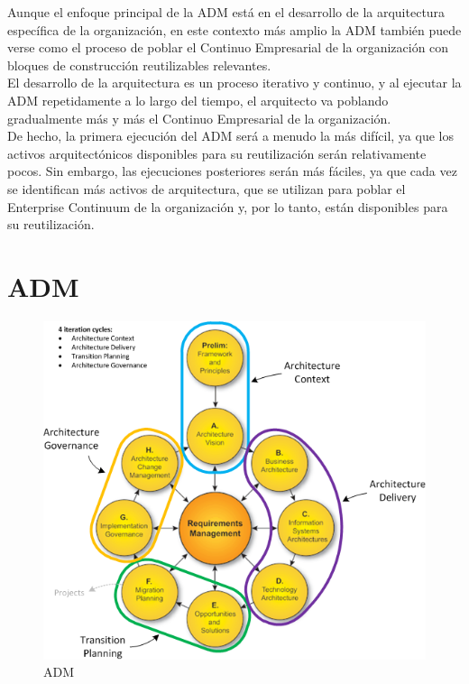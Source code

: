 Aunque el enfoque principal de la ADM está en el desarrollo de la arquitectura específica de la organización, en este contexto más amplio la ADM también puede verse como el proceso de poblar el Continuo Empresarial de la organización con bloques de construcción reutilizables relevantes.\\

El desarrollo de la arquitectura es un proceso iterativo y continuo, y al ejecutar la ADM repetidamente a lo largo del tiempo, el arquitecto va poblando gradualmente más y más el Continuo Empresarial de la organización.\\

De hecho, la primera ejecución del ADM será a menudo la más difícil, ya que los activos arquitectónicos disponibles para su reutilización serán relativamente pocos. Sin embargo, las ejecuciones posteriores serán más fáciles, ya que cada vez se identifican más activos de arquitectura, que se utilizan para poblar el Enterprise Continuum de la organización y, por lo tanto, están disponibles para su reutilización.

\newpage
\section{ADM}
\begin{figure}[h!]
	\centering
	\includegraphics[width=1\linewidth]{imgs/adm.png}
	\caption{ADM \cite{archi3.1,a1,a2,a3,a4}}
\end{figure}
